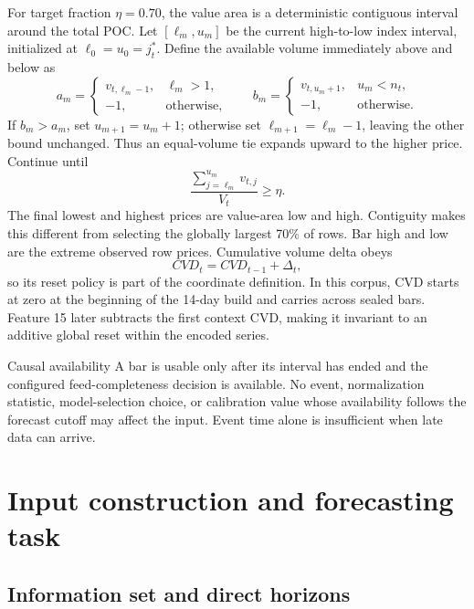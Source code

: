 \documentclass[10pt]{article}
\begin{document}
For target fraction $\eta=0.70$, the value area is a deterministic contiguous interval around the
total POC. Let $[\ell_m,u_m]$ be the current high-to-low index interval, initialized at
$\ell_0=u_0=j_t^*$. Define the available volume immediately above and below as
\begin{equation}
a_m=\begin{cases}v_{t,\ell_m-1},&\ell_m>1,\\-1,&\text{otherwise},\end{cases}
\qquad
b_m=\begin{cases}v_{t,u_m+1},&u_m<n_t,\\-1,&\text{otherwise}.
\end{cases}
\end{equation}
If $b_m>a_m$, set $u_{m+1}=u_m+1$; otherwise set $\ell_{m+1}=\ell_m-1$, leaving the other bound
unchanged. Thus an equal-volume tie expands upward to the higher price. Continue until
\begin{equation}
\frac{\sum_{j=\ell_m}^{u_m}v_{t,j}}{V_t}\ge\eta.
\end{equation}
The final lowest and highest prices are value-area low and high. Contiguity makes this different from
selecting the globally largest 70\% of rows. Bar high and low are the extreme observed row prices.
Cumulative volume delta obeys
\begin{equation}
CVD_t=CVD_{t-1}+\Delta_t,
\end{equation}
so its reset policy is part of the coordinate definition. In this corpus, CVD starts at zero at the
beginning of the 14-day build and carries across sealed bars. Feature 15 later subtracts the first
context CVD, making it invariant to an additive global reset within the encoded series.

\begin{definitionbox}{Causal availability}
A bar is usable only after its interval has ended and the configured feed-completeness decision is
available. No event, normalization statistic, model-selection choice, or calibration value whose
availability follows the forecast cutoff may affect the input. Event time alone is insufficient when
late data can arrive.
\end{definitionbox}

\section{Input construction and forecasting task}

\subsection{Information set and direct horizons}
\end{document}
